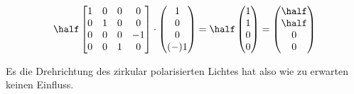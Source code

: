 \begin{align*}
\half 
\left[
\begin{matrix}
1 & 0 & 0 & 0 \\ 
0 & 1 & 0 & 0 \\ 
0 & 0 & 0 & -1 \\ 
0 & 0 & 1 & 0
\end{matrix} 
\right]
\cdot
\left(
\begin{matrix}
1 \\ 
0 \\ 
0 \\ 
(-)1
\end{matrix} 
\right)
=
\half
\left(
\begin{matrix}
1 \\ 
1 \\ 
0 \\ 
0
\end{matrix} 
\right)
=
\left(
\begin{matrix}
\half \\ 
\half \\ 
0 \\ 
0
\end{matrix} 
\right)
\end{align*}

Es die Drehrichtung des zirkular polarisierten Lichtes hat also wie zu erwarten keinen Einfluss. 



